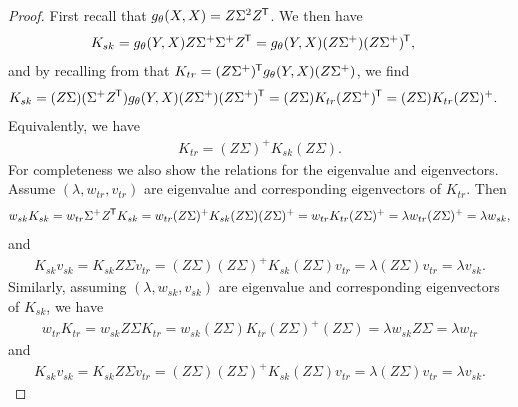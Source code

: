\documentclass[10pt,a4paper]{amsart}
\newcommand*{\tran}{^{\mkern-1.5mu\mathsf{T}}} %
\begin{document}
\begin{proof}
   First recall that \(g_{\theta}(X,X) = Z\Sigma^2 Z\tran\). We then have
   \begin{align*}
        K_{sk} &= g_{\theta}(Y,X) Z \Sigma^+ \Sigma^+ Z\tran = g_{\theta}(Y,X) (Z\Sigma^+) (Z \Sigma^+)\tran,
   \end{align*} 
   and by recalling from  that \(K_{tr} = (Z\Sigma^+)\tran g_{\theta}(Y,X) (Z\Sigma^+)\), we find
   \begin{align*}
        K_{sk} &=  (Z \Sigma) (\Sigma^+Z\tran) g_{\theta}(Y,X) (Z\Sigma^+) (Z \Sigma^+)\tran = (Z\Sigma) K_{tr} (Z\Sigma^+)\tran = (Z \Sigma)K_{tr} (Z\Sigma)^+.
   \end{align*}
   Equivalently, we have
   \begin{align*}
        K_{tr} = (Z\Sigma)^+ K_{sk} (Z\Sigma).
   \end{align*}
   For completeness we also show the relations for the eigenvalue and eigenvectors. Assume \((\lambda, w_{tr}, v_{tr})\) are eigenvalue and corresponding eigenvectors of \(K_{tr}\). Then 
   \begin{align*}
        w_{sk}K_{sk} = w_{tr} \Sigma^+ Z\tran K_{sk} = w_{tr} (Z\Sigma)^+ K_{sk} (Z\Sigma) (Z\Sigma)^+ = w_{tr} K_{tr} (Z\Sigma)^+ = \lambda w_{tr}(Z\Sigma)^+ = \lambda w_{sk},
   \end{align*}
   and
   \begin{align*}
        K_{sk} v_{sk} = K_{sk} Z\Sigma v_{tr} = (Z\Sigma) (Z\Sigma)^+ K_{sk} (Z\Sigma) v_{tr} = \lambda (Z\Sigma) v_{tr} = \lambda v_{sk}.
   \end{align*}
   Similarly, assuming \((\lambda, w_{sk}, v_{sk})\) are eigenvalue and corresponding eigenvectors of \(K_{sk}\), we have
   \begin{align*}
        w_{tr}K_{tr} = w_{sk} Z\Sigma K_{tr} = w_{sk} (Z\Sigma) K_{tr} (Z\Sigma)^+ (Z\Sigma) = \lambda w_{sk} Z\Sigma = \lambda w_{tr}
   \end{align*}
   and
   \begin{align*}
        K_{sk} v_{sk} = K_{sk} Z\Sigma v_{tr} = (Z\Sigma) (Z\Sigma)^+ K_{sk} (Z\Sigma) v_{tr} = \lambda (Z\Sigma) v_{tr} = \lambda v_{sk}.
   \end{align*}
\end{proof}
\end{document}

